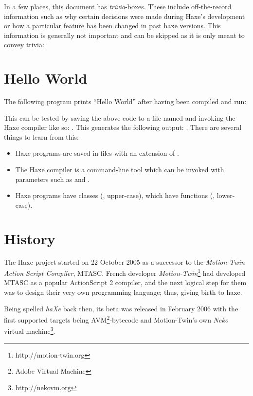 \documentclass{haxe}
\begin{document}
In a few places, this document has \emph{trivia}-boxes. These include off-the-record information such as why certain decisions were made during Haxe's development or how a particular feature has been changed in past haxe versions. This information is generally not important and can be skipped as it is only meant to convey trivia:



\section{Hello World}
\label{introduction-hello-world}

The following program prints ``Hello World'' after having been compiled and run:

This can be tested by saving the above code to a file named  and invoking the Haxe compiler like so: . This generates the following output: . There are several things to learn from this:

\begin{itemize}
	\item Haxe programs are saved in files with an extension of .
	\item The Haxe compiler is a command-line tool which can be invoked with parameters such as  and .
	\item Haxe programs have classes (, upper-case), which have functions (, lower-case). 
\end{itemize}

\section{History}
\label{introduction-haxe-history}

The Haxe project started on 22 October 2005 as a successor to the \emph{Motion-Twin Action Script Compiler}, MTASC. French developer \emph{Motion-Twin}\footnote{http://motion-twin.org} had developed MTASC as a popular ActionScript 2 compiler, and the next logical step for them was to design their very own programming language; thus, giving birth to haxe.

Being spelled \emph{haXe} back then, its beta was released in February 2006 with the first supported targets being AVM\footnote{Adobe Virtual Machine}-bytecode and Motion-Twin's own \emph{Neko} virtual machine\footnote{http://nekovm.org}.
\end{document}
